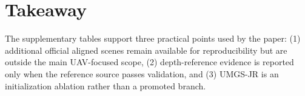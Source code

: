 ﻿\documentclass[acmtog,anonymous,review]{acmart}
\begin{document}
\begin{table}[H]
    \caption{UMGS-J and UMGS-JR quality/cost comparison from pilot runs. Band metrics are G/R/RE/NIR means. Index metrics are NDVI/GNDVI/NDRE means.}
    \label{tab:umgsj-quality-cost}
    \centering
    \tiny
    \setlength{\tabcolsep}{2pt}
\end{table}

\section{Takeaway}

The supplementary tables support three practical points used by the paper: (1) additional official aligned scenes remain available for reproducibility but are outside the main UAV-focused scope, (2) depth-reference evidence is reported only when the reference source passes validation, and (3) UMGS-JR is an initialization ablation rather than a promoted branch.
\end{document}
